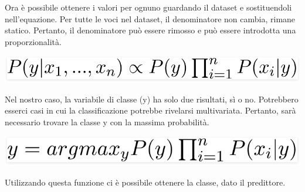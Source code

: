Ora è possibile ottenere i valori per ognuno guardando il dataset e sostituendoli nell'equazione. Per tutte le voci nel dataset, il denominatore non cambia, rimane statico. Pertanto, il denominatore può essere rimosso e può essere introdotta una proporzionalità.
\begin{center}    
    \includegraphics[width=0.9\linewidth]{images/image22.jpeg}
\end{center}


Nel nostro caso, la variabile di classe (y) ha solo due risultati, sì o no. Potrebbero esserci casi in cui la classificazione potrebbe rivelarsi multivariata. Pertanto, sarà necessario trovare la classe y con la massima probabilità.
\begin{center}    
    \includegraphics[width=0.5\linewidth]{images/image23.jpeg}
\end{center}

Utilizzando questa funzione ci è possibile ottenere la classe, dato il predittore.




